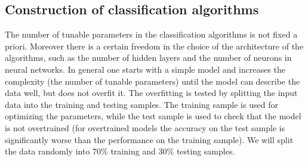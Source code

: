\subsection{Construction of classification algorithms}

The number of tunable parameters in the classification algorithms is not fixed a priori. 
Moreover there is a certain freedom in the choice of the architecture of the algorithms, such as
the number of hidden layers and the number of neurons in neural networks.
In general one starts with a simple model and increases the complexity (the number of tunable parameters)
until the model can describe the data well, but does not overfit it.
The overfitting is tested by splitting the input data into the training and testing samples.
The training sample is used for optimizing the parameters,
while the test sample is used to check that the model is not overtrained (for overtrained models the accuracy on the test
sample is significantly worse than the performance on the training sample).
We will split the data randomly into 70\% training and 30\% testing samples.

